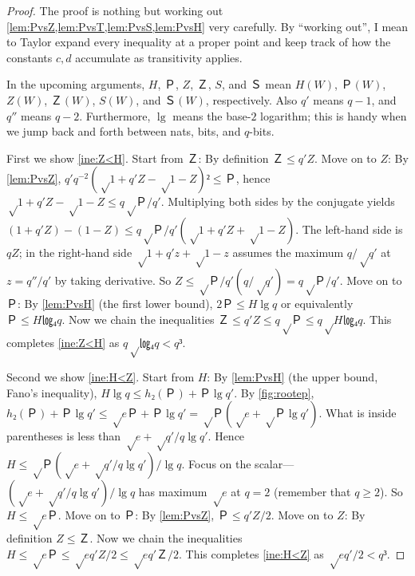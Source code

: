 \documentclass[openany]{amsbook}
\numberwithin{equation}{chapter}
\numberwithin{figure}{chapter}
\numberwithin{table}{chapter}
\theoremstyle{definition}	理dfn:Definition~?s			理exa:Example~?s
\theoremstyle{remark}		理cla:Claim~?s				理rem:Remark~?s
\begin{document}
	\begin{proof}
		The proof is nothing but working out
		\cref{lem:PvsZ,lem:PvsT,lem:PvsS,lem:PvsH} very carefully.
		By “working out”, I mean to Taylor expand every inequality at a proper point
		and keep track of how the constants $c,d$ accumulate as transitivity applies.
		
		In the upcoming arguments, $H$, $Ｐ$, $Z$, $Ｚ$, $S$, and $Ｓ$ mean
		$H(W)$, $Ｐ(W)$, $Z(W)$, $Ｚ(W)$, $S(W)$, and $Ｓ(W)$, respectively.
		Also $q'$ means $q-1$, and $q''$ means $q-2$.
		Furthermore, $\lg$ means the base-$2$ logarithm;
		this is handy when we jump back and forth between nats, bits, and $q$-bits.
		
		First we show \cref{ine:Z<H}.
		Start from $Ｚ$:
		By definition $Ｚ≤q'Z$.
		Move on to $Z$:
		By \cref{lem:PvsZ}, $q'q^{-2}(√{1+q'Z}-√{1-Z})²≤Ｐ$,
		hence $√{1+q'Z}-√{1-Z}≤q√{Ｐ/q'}$.
		Multiplying both sides by the conjugate yields
		$(1+q'Z)-(1-Z)≤q√{Ｐ/q'}(√{1+q'Z}+√{1-Z})$.
		The left-hand side is $qZ$;
		in the right-hand side $√{1+q'z}+√{1-z}$ assumes
		the maximum $q/√{q'}$ at $z=q''/q'$ by taking derivative.
		So $Z≤√{Ｐ/q'}(q/√{q'})=q√{Ｐ}/q'$.
		Move on to $Ｐ$:
		By \cref{lem:PvsH} (the first lower bound),
		$2Ｐ≤H\lg q$ or equivalently $Ｐ≤H㏒₄q$.
		Now we chain the inequalities $Ｚ≤q'Z≤q√{Ｐ}≤q√{H㏒₄q}$.
		This completes \cref{ine:Z<H} as $q√{㏒₄q}<q³$.
		
		Second we show \cref{ine:H<Z}.
		Start from $H$:
		By \cref{lem:PvsH} (the upper bound, Fano's inequality),
		$H\lg q≤h₂(Ｐ)+Ｐ\lg q'$.
		By \cref{fig:rootep}, $h₂(Ｐ)+Ｐ\lg q'≤√{eＰ}+Ｐ\lg q'=√{Ｐ}(√e+√{Ｐ}\lg q')$.
		What is inside parentheses is less than $√e+√{q'/q}\lg q'$.
		Hence $H≤√{Ｐ}(√e+√{q'/q}\lg q')/\lg q$.
		Focus on the scalar---$(√e+√{q'/q}\lg q')/\lg q$
		has maximum $√e$ at $q=2$ (remember that $q≥2$).
		So $H≤√{eＰ}$.
		Move on to $Ｐ$:
		By \cref{lem:PvsZ}, $Ｐ≤q'Z/2$.
		Move on to $Z$:
		By definition $Z≤Ｚ$.
		Now we chain the inequalities $H≤√{eＰ}≤√{eq'Z/2}≤√{eq'Ｚ/2}$.
		This completes \cref{ine:H<Z} as $√{eq'/2}<q³$.
		

\end{proof}
\end{document}
